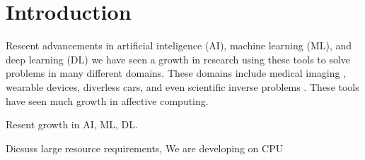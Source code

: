 \section{Introduction}
Rescent advancements in
artificial inteligence (AI),
machine learning (ML),
and deep learning (DL)
we have seen a growth in
research using these tools to
solve problems in many different domains.
These domains include medical imaging \cite{Greenspan:2016},
wearable devices,
diverless cars,
and even scientific inverse problems \cite{laanait2019exascale}.
These tools have seen much growth in affective computing.

Resent growth in AI, ML, DL.

Dicsuss large resource requirements, We are developing on CPU

